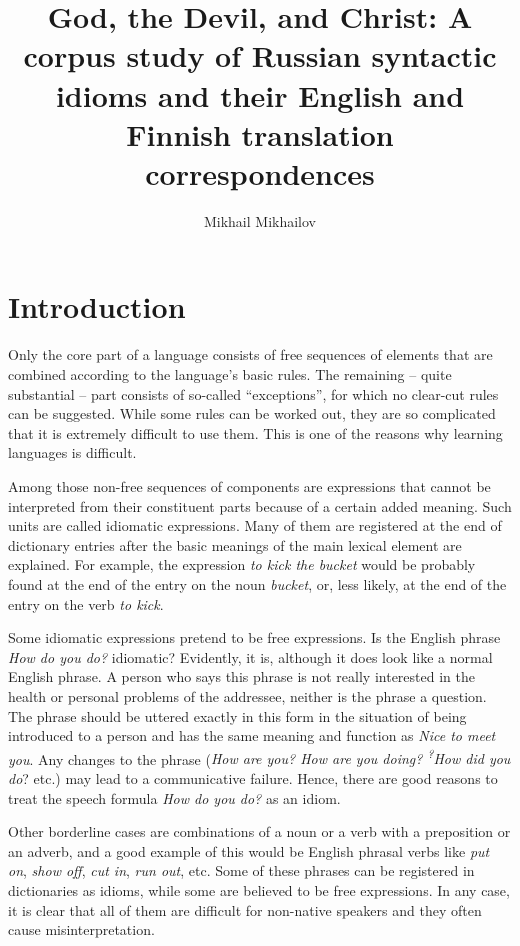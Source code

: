 \documentclass[output=paper]{langscibook}
\author{Mikhail Mikhailov\affiliation{Tampere University}}
\title[God, the Devil, and Christ]{God, the Devil, and Christ: A corpus study of Russian syntactic idioms and their English and Finnish translation correspondences}
\begin{document}
\maketitle 



\section{Introduction}

Only the core part of a language consists of free sequences of elements that are combined according to the language’s basic rules. The remaining – quite substantial – part consists of so-called “exceptions”, for which no clear-cut rules can be suggested. While some rules can be worked out, they are so complicated that it is extremely difficult to use them. This is one of the reasons why learning languages is difficult.

Among those non-free sequences of components are expressions that cannot be interpreted from their constituent parts because of a certain added meaning. Such units are called idiomatic expressions. Many of them are registered at the end of dictionary entries after the basic meanings of the main lexical element are explained. For example, the expression \textit{to kick the bucket} would be probably found at the end of the entry on the noun \textit{bucket}, or, less likely, at the end of the entry on the verb \textit{to kick}. 

Some idiomatic expressions pretend to be free expressions. Is the English phrase \textit{How do you do?} idiomatic? Evidently, it is, although it does look like a normal English phrase. A person who says this phrase is not really interested in the health or personal problems of the addressee, neither is the phrase a question. The phrase should be uttered exactly in this form in the situation of being introduced to a person and has the same meaning and function as \textit{Nice to meet you}. Any changes to the phrase (\textit{How are you? How are you doing? \textsuperscript{?}}\textit{How did you do}? etc.) may lead to a communicative failure. Hence, there are good reasons to treat the speech formula \textit{How do you do?} as an idiom.

Other borderline cases are combinations of a noun or a verb with a preposition or an adverb, and a good example of this would be English phrasal verbs like \textit{put on}, \textit{show off}, \textit{cut in}, \textit{run out}, etc. Some of these phrases can be registered in dictionaries as idioms, while some are believed to be free expressions. In any case, it is clear that all of them are difficult for non-native speakers and they often cause misinterpretation.
\end{document}
